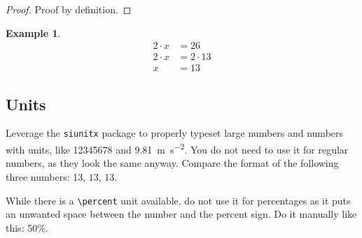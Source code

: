 \documentclass[parskip=half]{scrbook}
\newtheorem{example}{Example}
\begin{document}
\begin{proof}
	Proof by definition.
\end{proof}

\begin{example}
	\begin{align*}
		2 \cdot x &= 26\\
		2 \cdot x &= 2 \cdot 13\\
		x &= 13
	\end{align*}
	\label{ex:some_example}
\end{example}

\subsection{Units}

Leverage the \texttt{siunitx} package to properly typeset large numbers and numbers with units, like \num{12345678} and \SI{9.81}{\meter\per\second^2}.
You do not need to use it for regular numbers, as they look the same anyway.
Compare the format of the following three numbers: 13, $13$, \num{13}.

While there is a \texttt{\textbackslash{}percent} unit available, do not use it for percentages as it puts an unwanted space between the number and the percent sign.
Do it manually like this: 50\%.

\backmatter
\appendix

\printglossaries

\end{document}

